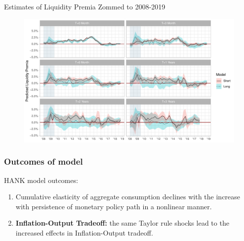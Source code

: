 \documentclass[10pt,aspectratio=169]{beamer}
\begin{document}
\begin{frame}{Estimates of Liquidity Premia Zommed to 2008-2019}
    \begin{figure}\centering 
        \begin{minipage}{0.87\textwidth}\centering
        \includegraphics[width=\textwidth]{estimates_of_liquidity_premia_plot_2008.pdf}
        \end{minipage}
    \end{figure}
\end{frame}


\begin{frame}
\end{frame}


\begin{frame}\frametitle{Outcomes of \cite{KMV2018} model}
    \cite{KMV2018} HANK model outcomes:
    \begin{enumerate}
        \item \textbf{} Cumulative elasticity of aggregate consumption declines with the increase with persistence of monetary policy path in a nonlinear manner.
        \item \textbf{Inflation-Output Tradeoff:} the same Taylor rule shocks lead to the increased effects in Inflation-Output tradeoff.
    \end{enumerate}  
\end{frame}
\end{document}
